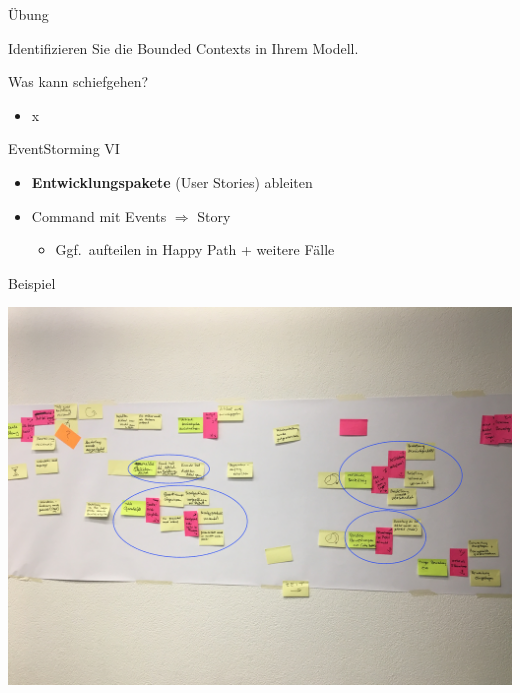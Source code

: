 \begin{frame}[fragile]{Übung}

Identifizieren Sie die Bounded Contexts in Ihrem Modell.

\end{frame}

\begin{frame}[fragile]{Was kann schiefgehen?}

\begin{itemize}
\item x
\end{itemize}

\end{frame}


\begin{frame}[fragile]{EventStorming VI}

\begin{itemize}
\item \textbf{Entwicklungspakete} (User Stories) ableiten
\item Command mit Events $\Rightarrow$ Story
\begin{itemize}
\item Ggf.~aufteilen in Happy Path + weitere Fälle
\end{itemize}
\end{itemize}

\end{frame}

\begin{frame}[fragile]{Beispiel}

\begin{center}
\includegraphics[width=.85\textwidth]{pics/eventstorming_stories.jpg}
\end{center}

\end{frame}

